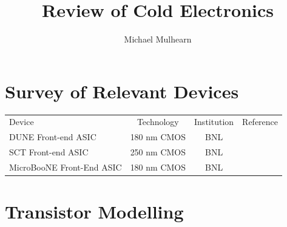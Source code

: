 \documentclass[12pt]{article}
\begin{document}

\title{Review of Cold Electronics}
\author{Michael Mulhearn}

\maketitle

\section{Survey of Relevant Devices}

\begin{tabular}{lccc}
Device & Technology & Institution & Reference \\
DUNE Front-end ASIC & 180 nm CMOS & BNL & \cite{bnl-dune-afe}\\
SCT Front-end ASIC & 250 nm CMOS & BNL & \cite{bnl-telescope}\\
MicroBooNE Front-End ASIC & 180 nm CMOS & BNL & \\
\end{tabular}




\section{Transistor Modelling}
\end{document}
